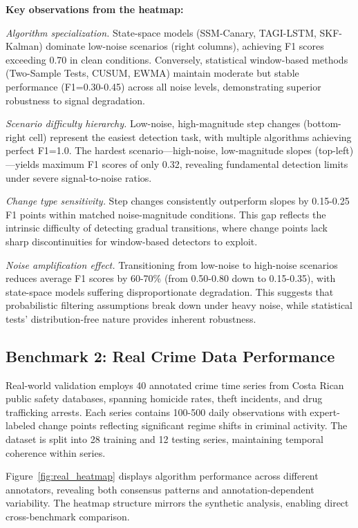 \textbf{Key observations from the heatmap:}

\textit{Algorithm specialization.} State-space models (SSM-Canary, TAGI-LSTM, SKF-Kalman) dominate low-noise scenarios (right columns), achieving F1 scores exceeding 0.70 in clean conditions. Conversely, statistical window-based methods (Two-Sample Tests, CUSUM, EWMA) maintain moderate but stable performance (F1=0.30-0.45) across all noise levels, demonstrating superior robustness to signal degradation.

\textit{Scenario difficulty hierarchy.} Low-noise, high-magnitude step changes (bottom-right cell) represent the easiest detection task, with multiple algorithms achieving perfect F1=1.0. The hardest scenario—high-noise, low-magnitude slopes (top-left)—yields maximum F1 scores of only 0.32, revealing fundamental detection limits under severe signal-to-noise ratios.

\textit{Change type sensitivity.} Step changes consistently outperform slopes by 0.15-0.25 F1 points within matched noise-magnitude conditions. This gap reflects the intrinsic difficulty of detecting gradual transitions, where change points lack sharp discontinuities for window-based detectors to exploit.

\textit{Noise amplification effect.} Transitioning from low-noise to high-noise scenarios reduces average F1 scores by 60-70\% (from 0.50-0.80 down to 0.15-0.35), with state-space models suffering disproportionate degradation. This suggests that probabilistic filtering assumptions break down under heavy noise, while statistical tests' distribution-free nature provides inherent robustness.


\subsection{Benchmark 2: Real Crime Data Performance}
\label{sec:results_real}

Real-world validation employs 40 annotated crime time series from Costa Rican public safety databases, spanning homicide rates, theft incidents, and drug trafficking arrests. Each series contains 100-500 daily observations with expert-labeled change points reflecting significant regime shifts in criminal activity. The dataset is split into 28 training and 12 testing series, maintaining temporal coherence within series.

Figure~\ref{fig:real_heatmap} displays algorithm performance across different annotators, revealing both consensus patterns and annotation-dependent variability. The heatmap structure mirrors the synthetic analysis, enabling direct cross-benchmark comparison.

